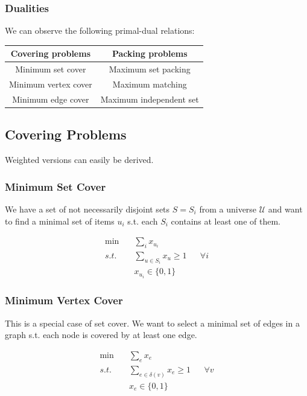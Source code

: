 \subsubsection{Dualities}
We can observe the following primal-dual relations:

\begin{center}
\begin{tabular}{c|c}
\textbf{Covering problems} & \textbf{Packing problems}\\
\hline
Minimum set cover &	Maximum set packing\\
Minimum vertex cover & Maximum matching\\
Minimum edge cover & Maximum independent set\\
\end{tabular}
\end{center}

\subsection{Covering Problems}

Weighted versions can easily be derived.

\subsubsection{Minimum Set Cover}

We have a set of not necessarily disjoint sets $S=S_i$ from a universe $\mathcal{U}$ and want to find a minimal set of items $u_i$ s.t. each $S_i$ contains at least one of them.

\begin{align*}
\min \quad & \sum_i x_{u_i}\\
s.t. \quad & \sum_{u\in S_i} x_{u} \geq 1 && \forall i\\
	& x_{u_i} \in \{0,1\}
\end{align*}

\subsubsection{Minimum Vertex Cover}

This is a special case of set cover. We want to select a minimal set of edges in a graph s.t. each node is covered by at least one edge.

\begin{align*}
\min \quad & \sum_e x_e \\
s.t. \quad & \sum_{e\in \delta(v)} x_e \geq 1 && \forall v\\
	& x_{e} \in \{0,1\}
\end{align*}
